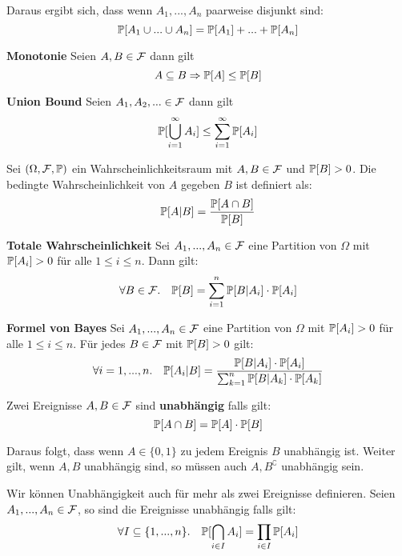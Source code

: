 Daraus ergibt sich, dass wenn $A_1, ..., A_n$ paarweise disjunkt sind: 
$$\mathbb{P}[A_1 \cup ... \cup A_n] = \mathbb{P}[A_1] + ... + \mathbb{P}[A_n]$$

\begin{mainbox}{\textbf{Monotonie}}
Seien $A, B \in \mathcal{F}$ dann gilt 
$$A \subseteq B \Rightarrow \mathbb{P}[A] \leq \mathbb{P}[B]$$
\end{mainbox}

\begin{mainbox}{\textbf{Union Bound}} Seien $A_1, A_2, ... \in \mathcal{F}$ dann gilt 
$$\mathbb{P}[\bigcup_{i = 1}^\infty A_i] \leq \sum_{i = 1}^\infty \mathbb{P}[A_i]$$
\end{mainbox}



Sei $(\Omega, \mathcal{F}, \mathbb{P})$ ein Wahrscheinlichkeitsraum mit $A, B \in \mathcal{F}$ und $\mathbb{P}[B] > 0$. Die bedingte Wahrscheinlichkeit von $A$ gegeben $B$ ist definiert als:
$$\mathbb{P}[A | B] = \frac{\mathbb{P}[A \cap B]}{\mathbb{P}[B]}$$

\begin{mainbox}{\textbf{Totale Wahrscheinlichkeit}} Sei $A_1, ..., A_n \in \mathcal{F}$ eine Partition von $\Omega$ mit $\mathbb{P}[A_i] > 0$ für alle $1 \leq i \leq n$. Dann gilt:
$$\forall B \in \mathcal{F}. \quad \mathbb{P}[B] = \sum_{i = 1}^n \mathbb{P}[B | A_i] \cdot \mathbb{P}[A_i]$$
\end{mainbox}

\begin{mainbox}{\textbf{Formel von Bayes}} Sei $A_1, ..., A_n \in \mathcal{F}$ eine Partition von $\Omega$ mit $\mathbb{P}[A_i] > 0$ für alle $1 \leq i \leq n$. Für jedes $B \in \mathcal{F}$ mit $\mathbb{P}[B] > 0$ gilt:
$$\forall i = 1,...,n. \quad \mathbb{P}[A_i | B] = \frac{\mathbb{P}[B | A_i] \cdot \mathbb{P}[A_i]}{\sum_{k = 1}^n \mathbb{P}[B | A_k] \cdot \mathbb{P}[A_k]}$$
\end{mainbox}



\begin{mainbox}{}
    Zwei Ereignisse $A, B \in \mathcal{F}$ sind \textbf{unabhängig} falls gilt:
    $$\mathbb{P}[A \cap B] = \mathbb{P}[A] \cdot \mathbb{P}[B]$$
\end{mainbox}

Daraus folgt, dass wenn $A \in \{0, 1\}$ zu jedem Ereignis $B$ unabhängig ist. Weiter gilt, wenn $A, B$ unabhängig sind, so müssen auch $A, B^\complement$ unabhängig sein. \medskip

Wir können Unabhängigkeit auch für mehr als zwei Ereignisse definieren. Seien $A_1, ..., A_n \in \mathcal{F}$, so sind die Ereignisse unabhängig falls gilt:
$$\forall I \subseteq \{1, ..., n\}. \quad \mathbb{P}[\bigcap_{i \in I} A_i] = \prod_{i \in I} \mathbb{P}[A_i]$$